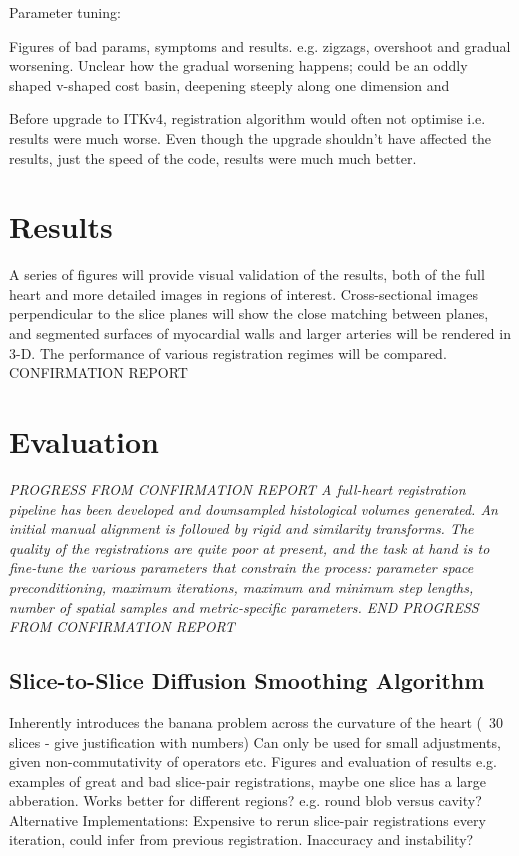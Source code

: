       Parameter tuning:
      
      Figures of bad params, symptoms and results. e.g. zigzags, overshoot and gradual worsening. Unclear how the gradual worsening happens; could be an oddly shaped v-shaped cost basin, deepening steeply along one dimension and 
      
      Before upgrade to ITKv4, registration algorithm would often not optimise i.e. results were much worse. Even though the upgrade shouldn't have affected the results, just the speed of the code, results were much much better.
   
\section{Results}
  A series of figures will provide visual validation of the results, both of the full heart and more detailed images in regions of interest. Cross-sectional images perpendicular to the slice planes will show the close matching between planes, and segmented surfaces of myocardial walls and larger arteries will be rendered in 3-D. The performance of various registration regimes will be compared.
CONFIRMATION REPORT

\section{Evaluation} %
\label{sec:evaluation}

\textit{PROGRESS FROM CONFIRMATION REPORT 
A full-heart registration pipeline has been developed and downsampled histological volumes generated. An initial manual alignment is followed by rigid and similarity transforms. The quality of the registrations are quite poor at present, and the task at hand is to fine-tune the various parameters that constrain the process: parameter space preconditioning, maximum iterations, maximum and minimum step lengths, number of spatial samples and metric-specific parameters.
END PROGRESS FROM CONFIRMATION REPORT
}

  \subsection{Slice-to-Slice Diffusion Smoothing Algorithm}
    Inherently introduces the banana problem across the curvature of the heart (~30 slices - give justification with numbers)
    Can only be used for small adjustments, given non-commutativity of operators etc.
    Figures and evaluation of results e.g. examples of great and bad slice-pair registrations, maybe one slice has a large abberation. Works better for different regions? e.g. round blob versus cavity?
    Alternative Implementations: Expensive to rerun slice-pair registrations every iteration, could infer from previous registration. Inaccuracy and instability?
    
